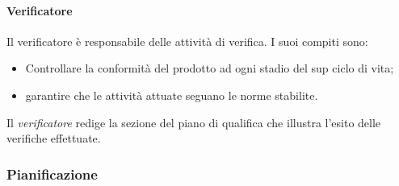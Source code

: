 \paragraph{Verificatore}
Il verificatore è responsabile delle attività di verifica.
I suoi compiti sono:
\begin{itemize}
	\item Controllare la conformità del prodotto ad ogni stadio del sup ciclo di vita;
	\item garantire che le attività attuate seguano le norme stabilite.
\end{itemize}
Il \emph{verificatore} redige la sezione del piano di qualifica che illustra l'esito delle verifiche effettuate.


\subsubsection{Pianificazione}
